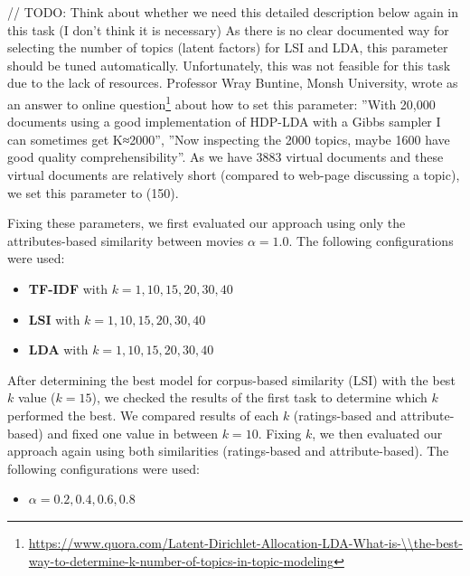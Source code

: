 \documentclass{sigish}
\begin{document}
// TODO: Think about whether we need this detailed description below again in this task (I don't think it is necessary)
As there is no clear documented way for selecting the number of topics (latent factors) for LSI and LDA, this parameter should be tuned automatically. Unfortunately, this was not feasible for this task due to the lack of resources. Professor Wray Buntine, Monsh University, wrote as an answer to online question\footnote{\url{https://www.quora.com/Latent-Dirichlet-Allocation-LDA-What-is-\\the-best-way-to-determine-k-number-of-topics-in-topic-modeling}} about how to set this parameter: ''With 20,000 documents using a good implementation of HDP-LDA with a Gibbs sampler I can sometimes get  K≈2000'', ''Now inspecting the 2000 topics, maybe 1600 have good quality comprehensibility''. As we have 3883 virtual documents and these virtual documents are relatively short (compared to web-page discussing a topic), we set this parameter to (150).

Fixing these parameters, we first evaluated our approach using only the attributes-based similarity between movies $ \alpha=1.0 $. The following configurations were used:
\begin{itemize}
\item \textbf{TF-IDF} with $ k = {1, 10, 15, 20, 30, 40} $
\item \textbf{LSI} with $ k = {1, 10, 15, 20, 30, 40} $
\item \textbf{LDA} with $ k = {1, 10, 15, 20, 30, 40} $
\end{itemize}

After determining the best model for corpus-based similarity (LSI) with the best $ k $ value ($ k = 15 $), we checked the results of the first task to determine which $ k $ performed the best. We compared results of each $ k $ (ratings-based and attribute-based) and fixed one value in between $ k=10 $. Fixing $ k $, we then evaluated our approach again using both similarities (ratings-based and attribute-based). The following configurations were used:
\begin{itemize}
\item $ \alpha = {0.2, 0.4, 0.6, 0.8} $
\end{itemize}
\end{document}
